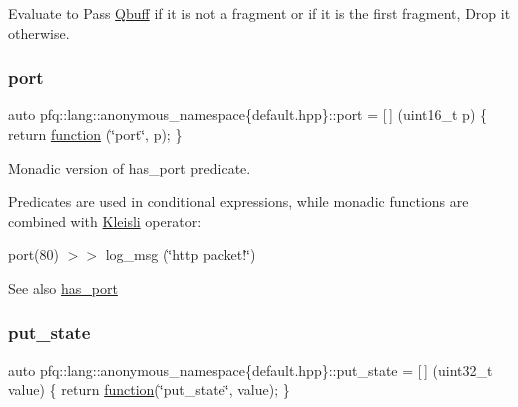 Evaluate to {\ttfamily Pass} \hyperlink{structpfq_1_1lang_1_1Qbuff}{Qbuff} if it is not a fragment or if it is the first fragment, {\ttfamily Drop} it otherwise. 

\mbox{\label{namespacepfq_1_1lang_1_1anonymous__namespace_02default_8hpp_03_a868eca03290a037cb4e9b7075085888b}} 
\subsubsection{\texorpdfstring{port}{port}}
{\footnotesize\ttfamily auto pfq\+::lang\+::anonymous\+\_\+namespace\{default.\+hpp\}\+::port = \mbox{[}$\,$\mbox{]} (uint16\+\_\+t p) \{ return \hyperlink{namespacepfq_1_1lang_a1a4638059d700ae08d0ca63886ff2bb3}{function} (\char`\"{}port\char`\"{}, p); \}}



Monadic version of {\ttfamily has\+\_\+port} predicate. 

Predicates are used in conditional expressions, while monadic functions are combined with \hyperlink{structpfq_1_1lang_1_1Kleisli}{Kleisli} operator\+:

port(80) $>$$>$ log\+\_\+msg (\char`\"{}http packet!\char`\"{})

\begin{DoxySeeAlso}{See also}
\hyperlink{namespacepfq_1_1lang_1_1anonymous__namespace_02default_8hpp_03_a9f7161b8dfb842c5a845f413eb6bc82f}{has\+\_\+port} 
\end{DoxySeeAlso}
\mbox{\label{namespacepfq_1_1lang_1_1anonymous__namespace_02default_8hpp_03_afd94f51db878b2f70225c944c3f1d300}} 
\subsubsection{\texorpdfstring{put\+\_\+state}{put\_state}}
{\footnotesize\ttfamily auto pfq\+::lang\+::anonymous\+\_\+namespace\{default.\+hpp\}\+::put\+\_\+state = \mbox{[}$\,$\mbox{]} (uint32\+\_\+t value) \{ return \hyperlink{namespacepfq_1_1lang_a1a4638059d700ae08d0ca63886ff2bb3}{function}(\char`\"{}put\+\_\+state\char`\"{}, value); \}}



